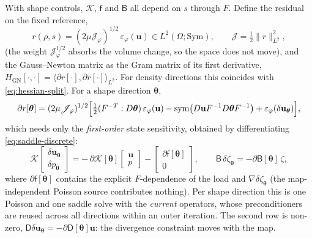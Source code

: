 \documentclass[11pt]{article}
\newcommand{\Jf}{\mathscr{J}}  %
\newcommand{\eps}{\varepsilon}
\newcommand{\bu}{\mathbf{u}}
\newcommand{\sym}{\operatorname{sym}}
\newcommand{\norm}[1]{\lVert #1 \rVert}
\newcommand{\ip}[2]{\langle #1, #2\rangle}
\begin{document}
With shape controls, $\mathcal{K}$, $\mathsf{f}$ and $\mathsf{B}$ all
depend on $s$ through $F$. Define the residual on the fixed reference,
\begin{equation}
  r(\rho, s) = (2\mu \Jf _\varphi)^{1/2}\,\eps_\varphi(\bu)
  \in L^2(\Omega;\mathrm{Sym}),
  \qquad \Jf  = \tfrac12\norm{r}^{2}_{L^2} ,
\end{equation}
(the weight $\Jf _\varphi^{1/2}$ absorbs the volume change, so the space
does not move), and the Gauss--Newton matrix as the Gram matrix of its
first derivative, $H_{\mathrm{GN}}[\cdot,\cdot] =
\ip{\partial r[\cdot]}{\partial r[\cdot]}_{L^2}$. For density directions
this coincides with \eqref{eq:hessian-split}. For a shape direction
$\bm{\theta}$,
\begin{equation}
  \partial r[\bm{\theta}] = (2\mu \Jf _\varphi)^{1/2}\Bigl[
  \tfrac12(F^{-T}:D\bm{\theta})\,\eps_\varphi(\bu)
  - \sym\bigl(D\bu F^{-1}D\bm{\theta}F^{-1}\bigr)
  + \eps_\varphi(\delta\bu_{\bm{\theta}})\Bigr],
\end{equation}
which needs only the \emph{first-order} state sensitivity, obtained by
differentiating \eqref{eq:saddle-discrete}:
\begin{equation}
  \mathcal{K}\begin{bmatrix}\delta\bu_{\bm{\theta}}\\ \delta p_{\bm{\theta}}\end{bmatrix}
  = -\,\partial\mathcal{K}[\bm{\theta}]\begin{bmatrix}\bu\\ p\end{bmatrix}
  - \begin{bmatrix}\partial\mathsf{f}[\bm{\theta}]\\ 0\end{bmatrix},
  \qquad
  \mathsf{B}\,\delta\zeta_{\bm{\theta}} = -\partial\mathsf{B}[\bm{\theta}]\,\zeta ,
\end{equation}
where $\partial\mathsf{f}[\bm{\theta}]$ contains the explicit $F$-dependence
of the load and $\nabla\delta\zeta_{\bm{\theta}}$ (the map-independent
Poisson source contributes nothing). Per shape direction this is one
Poisson and one saddle solve with the \emph{current} operators, whose
preconditioners are reused across all directions within an outer
iteration. The second row is non-zero, $\mathsf{D}\delta\bu_{\bm{\theta}} =
-\partial\mathsf{D}[\bm{\theta}]\bu$: the divergence constraint moves with
the map.
\end{document}
